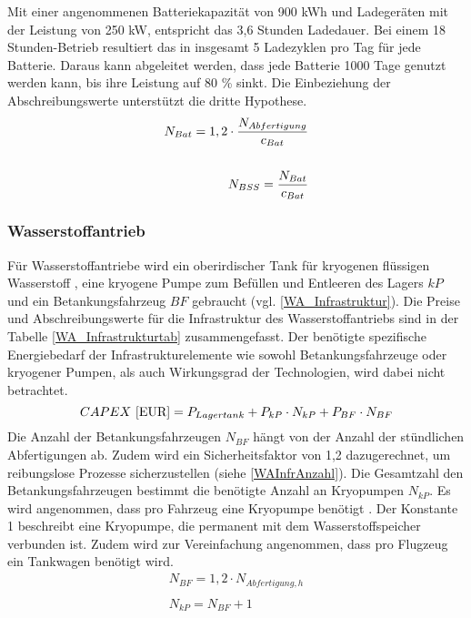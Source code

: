 Mit einer angenommenen Batteriekapazität von 900 kWh und Ladegeräten 
mit der Leistung von 250 kW, entspricht das 3,6 Stunden Ladedauer.
Bei einem 18 Stunden-Betrieb resultiert das in insgesamt 5 Ladezyklen pro Tag für jede Batterie. %
Daraus kann abgeleitet werden, dass jede Batterie 1000 Tage genutzt werden kann,
bis ihre Leistung auf 80 \% sinkt.
Die Einbeziehung der Abschreibungswerte unterstützt die dritte Hypothese.\\
%
\begin{equation}
   \centering
   \begin{split}
  {N_{Bat}} = {1,2} \cdot \frac{N_{Abfertigung}}{c_{Bat}}\\
  \\
   {N_{BSS}} = \frac{N_{Bat}}{c_{Bat}}\\
   \label{BatInfrAnzahl}
    \end{split}
   \end{equation}
%
\subsubsection{Wasserstoffantrieb}

Für Wasserstoffantriebe wird ein oberirdischer Tank für kryogenen flüssigen Wasserstoff , 
eine kryogene Pumpe zum Befüllen und Entleeren des Lagers ${kP}$ 
und ein Betankungsfahrzeug ${BF}$ gebraucht (vgl. \eqref{WA_Infrastruktur}). 
Die Preise und Abschreibungswerte für die Infrastruktur des Wasserstoffantriebs 
sind in der Tabelle \ref{WA_Infrastrukturtab} zusammengefasst. 
%
Der benötigte spezifische Energiebedarf der Infrastrukturelemente wie sowohl Betankungsfahrzeuge 
oder kryogener Pumpen, als auch Wirkungsgrad der Technologien, wird dabei nicht betrachtet.
%
\begin{equation}
   {CAPEX ~[\text{EUR}]} = {P_{Lagertank}} + P_{kP} \cdot N_{kP} + P_{BF} \cdot N_{BF}  \\
   \label{WA_Infrastruktur}
\end{equation}
%
Die Anzahl der Betankungsfahrzeugen $N_{BF}$ hängt von der Anzahl der stündlichen Abfertigungen ab. 
Zudem wird ein Sicherheitsfaktor
von 1,2 dazugerechnet, um reibungslose Prozesse sicherzustellen (siehe \eqref{WAInfrAnzahl}).
Die Gesamtzahl den Betankungsfahrzeugen bestimmt die benötigte Anzahl an Kryopumpen $N_{kP}$. 
Es wird angenommen, dass pro Fahrzeug eine Kryopumpe benötigt \cite{hoelzen2022h2}.
Der Konstante 1 beschreibt eine Kryopumpe,
die permanent mit dem Wasserstoffspeicher verbunden ist.
Zudem wird zur Vereinfachung angenommen, dass pro Flugzeug ein Tankwagen benötigt wird.
\begin{equation}
   \begin{split}
   {N_{BF}} = {1,2} \cdot {N_{Abfertigung,h}}\\
 \\
   {N_{kP}} = N_{BF} + 1 \\
   \label{WAInfrAnzahl}
   \end{split}
   \end{equation}

